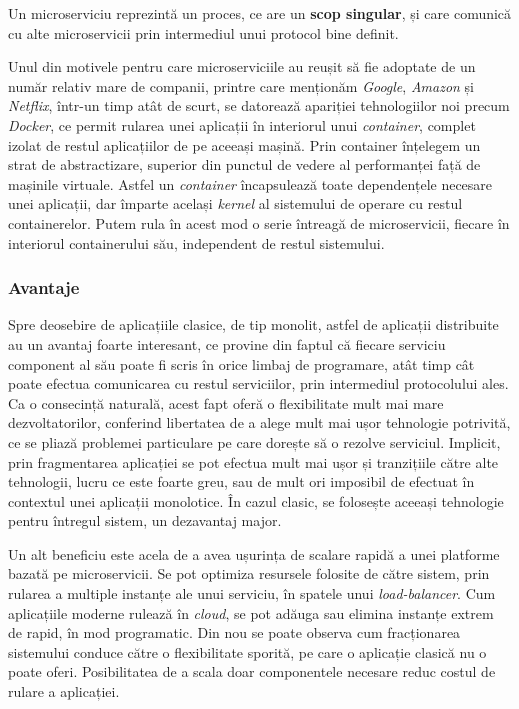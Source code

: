 \begin{definition}
	Un microserviciu reprezintă un proces, ce are un \textbf{scop singular}, și care comunică cu alte microservicii prin intermediul unui protocol bine definit.
\end{definition}

Unul din motivele pentru care microserviciile au reușit să fie adoptate de un număr relativ mare de companii, printre care menționăm \textit{Google}, \textit{Amazon} și \textit{Netflix}, într-un timp atât de scurt, se datorează apariției tehnologiilor noi precum \textit{Docker}, ce permit rularea unei aplicații în interiorul unui \textit{container}, complet izolat de restul aplicațiilor de pe aceeași mașină. Prin container înțelegem un strat de abstractizare, superior din punctul de vedere al performanței față de mașinile virtuale. Astfel un \textit{container} încapsulează toate dependențele necesare unei aplicații, dar împarte același \textit{kernel} al sistemului de operare cu restul containerelor. Putem rula în acest mod o serie întreagă de microservicii, fiecare în interiorul containerului său, independent de restul sistemului.

\subsubsection{Avantaje}

Spre deosebire de aplicațiile clasice, de tip monolit, astfel de aplicații distribuite au un avantaj foarte interesant, ce provine din faptul că fiecare serviciu component al său poate fi scris în orice limbaj de programare, atât timp cât poate efectua comunicarea cu restul serviciilor, prin intermediul protocolului ales. Ca o consecință naturală, acest fapt oferă o flexibilitate mult mai mare dezvoltatorilor, conferind libertatea de a alege mult mai ușor tehnologie potrivită, ce se pliază problemei particulare pe care dorește să o rezolve serviciul. Implicit, prin fragmentarea aplicației se pot efectua mult mai ușor și tranzițiile către alte tehnologii, lucru ce este foarte greu, sau de mult ori imposibil de efectuat în contextul unei aplicații monolotice. În cazul clasic, se folosește aceeași tehnologie pentru întregul sistem, un dezavantaj major.

Un alt beneficiu este acela de a avea ușurința de scalare rapidă a unei platforme bazată pe microservicii. Se pot optimiza resursele folosite de către sistem, prin rularea a multiple instanțe ale unui serviciu, în spatele unui \textit{load-balancer}. Cum aplicațiile moderne rulează în \textit{cloud}, se pot adăuga sau elimina instanțe extrem de rapid, în mod programatic. Din nou se poate observa cum fracționarea sistemului conduce către o flexibilitate sporită, pe care o aplicație clasică nu o poate oferi. Posibilitatea de a scala doar componentele necesare reduc costul de rulare a aplicației.


